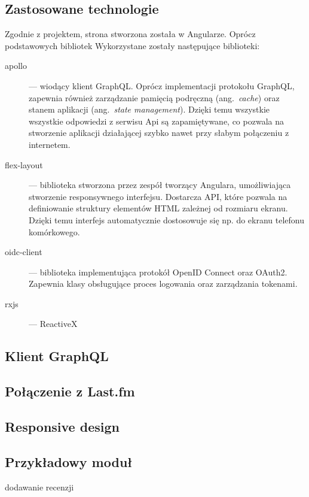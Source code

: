	\subsection{Zastosowane technologie}
		Zgodnie z projektem, strona stworzona została w Angularze.
		Oprócz podstawowych bibliotek Wykorzystane zostały następujące biblioteki:
		\begin{description}
			\item[apollo] --- wiodący klient GraphQL. Oprócz implementacji protokołu GraphQL,
			zapewnia również zarządzanie pamięcią podręczną (ang.\ \emph{cache}) oraz stanem aplikacji (ang.\ \emph{state management}).
			Dzięki temu wszystkie wszystkie odpowiedzi z serwisu Api są zapamiętywane,
			co pozwala na stworzenie aplikacji działającej szybko nawet przy słabym połączeniu z internetem.
			
			\item[flex-layout] --- biblioteka stworzona przez zespół tworzący Angulara, umożliwiająca stworzenie responsywnego interfejsu.
				Dostarcza API, które pozwala na definiowanie struktury elementów HTML zależnej od rozmiaru ekranu.
				Dzięki temu interfejs automatycznie dostosowuje się np. do ekranu telefonu komórkowego.
			
			\item[oidc-client] --- biblioteka implementująca protokół OpenID Connect oraz OAuth2.
				Zapewnia klasy obsługujące proces logowania oraz zarządzania tokenami.

			\item[rxjs] --- ReactiveX 

		\end{description}

	\subsection{Klient GraphQL}

	\subsection{Połączenie z Last.fm}

	\subsection{Responsive design}

	\subsection{Przykładowy moduł}
		dodawanie recenzji

